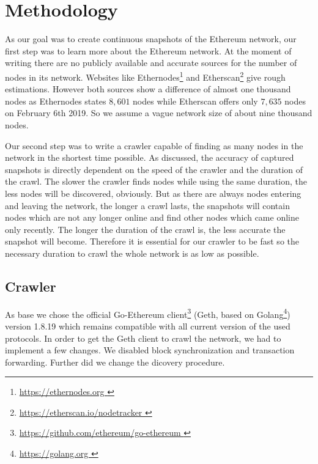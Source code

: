 \documentclass[10pt,conference,final]{IEEEtran}
\begin{document}
\vspace{2mm}

\section{Methodology}
\label{sec:Methodology}
As our goal was to create continuous snapshots of the Ethereum network, our first step was to learn more about the Ethereum network.
At the moment of writing there are no publicly available and accurate sources for the number of nodes in its network.
Websites like Ethernodes\footnote{\url{https://ethernodes.org }} and Etherscan\footnote{\url{https://etherscan.io/nodetracker }} give rough estimations.
However both sources show a difference of almost one thousand nodes as Ethernodes states $8,601$ nodes while Etherscan offers only $7,635$ nodes on February 6th 2019.
So we assume a vague network size of about nine thousand nodes.

Our second step was to write a crawler capable of finding as many nodes in the network in the shortest time possible.
As \cite{38} discussed, the accuracy of captured snapshots is directly dependent on the speed of the crawler and the duration of the crawl.
The slower the crawler finds nodes while using the same duration, the less nodes will be discovered, obviously.
But as there are always nodes entering and leaving the network, the longer a crawl lasts, the snapshots will contain nodes which are not any longer online and find other nodes which came online only recently.
The longer the duration of the crawl is, the less accurate the snapshot will become.
Therefore it is essential for our crawler to be fast so the necessary duration to crawl the whole network is as low as possible.

\vspace{2mm}

\subsection{Crawler}
\label{sec:Crawler}
As base we chose the official Go-Ethereum client\footnote{\url{https://github.com/ethereum/go-ethereum }} (Geth, based on Golang\footnote{\url{https://golang.org }}) version 1.8.19 which remains compatible with all current version of the used protocols.
In order to get the Geth client to crawl the network, we had to implement a few changes.
We disabled block synchronization and transaction forwarding.
Further did we change the dicovery procedure.
\end{document}
